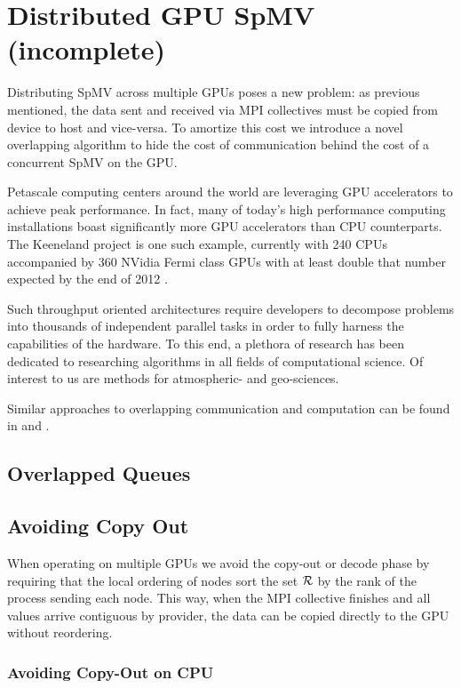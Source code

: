 \documentclass{report}
\begin{document}
\chapter{Distributed GPU SpMV (incomplete)}
\label{chap:multigpu_rbffd}

Distributing SpMV across multiple GPUs poses a new problem: as previous mentioned, the data sent and received via MPI collectives must be copied from device to host and vice-versa. To amortize this cost we introduce a novel overlapping algorithm to hide the cost of communication behind the cost of a concurrent SpMV on the GPU. 


Petascale computing centers around the world are leveraging GPU accelerators to achieve peak performance. In fact, many of today's high performance computing installations boast significantly more GPU accelerators than CPU counterparts. The Keeneland project is one such example, currently with 240 CPUs accompanied by 360 NVidia Fermi class GPUs with at least double that number expected by the end of 2012 \cite{Vetter2011}. 

Such throughput oriented architectures require developers to decompose problems into thousands of independent parallel tasks in order to fully harness the capabilities of the hardware. To this end, a plethora of research has been dedicated to researching algorithms in all fields of computational science. Of interest to us are methods for atmospheric- and geo-sciences. 


Similar approaches to overlapping communication and computation can be found in \cite{Schubert2011} and \cite{Thibault2009}.

\section{Overlapped Queues}

\section{Avoiding Copy Out}
When operating on multiple GPUs we avoid the copy-out or decode phase by requiring that the local ordering of nodes sort the set $\mathcal{R}$ by the rank of the process sending each node. This way, when the MPI collective finishes and all values arrive contiguous by provider, the data can be copied directly to the GPU without reordering.




\subsection{Avoiding Copy-Out on CPU}
\end{document}
